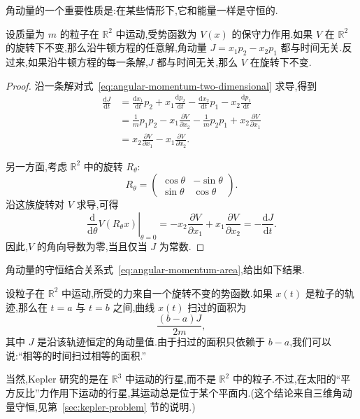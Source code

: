 角动量的一个重要性质是:在某些情形下,它和能量一样是守恒的.

\begin{proposition}[旋转不变性与角动量]\label{pro:angular-momentum-conservation}
设质量为 $m$ 的粒子在 $\mathbb{R}^{2}$ 中运动,受势函数为 $V(x)$ 的保守力作用.如果 $V$ 在 $\mathbb{R}^{2}$ 的旋转下不变,那么沿牛顿方程的任意解,角动量 $J=x_{1}p_{2}-x_{2}p_{1}$ 都与时间无关.反过来,如果沿牛顿方程的每一条解,$J$ 都与时间无关,那么 $V$ 在旋转下不变.
\end{proposition}

\begin{proof}
沿一条解对式~\eqref{eq:angular-momentum-two-dimensional} 求导,得到
\begin{align*}
\frac{\mathrm{d}J}{\mathrm{d}t}
 &=\frac{\mathrm{d}x_{1}}{\mathrm{d}t}p_{2}+x_{1}\frac{\mathrm{d}p_{2}}{\mathrm{d}t}
  -\frac{\mathrm{d}x_{2}}{\mathrm{d}t}p_{1}-x_{2}\frac{\mathrm{d}p_{1}}{\mathrm{d}t}\\
 &=\frac1m p_{1}p_{2}-x_{1}\frac{\partial V}{\partial x_{2}}
  -\frac1m p_{2}p_{1}+x_{2}\frac{\partial V}{\partial x_{1}}\\
 &=x_{2}\frac{\partial V}{\partial x_{1}}-x_{1}\frac{\partial V}{\partial x_{2}}.
\end{align*}

另一方面,考虑 $\mathbb{R}^{2}$ 中的旋转 $R_{\theta}$:
\[
  R_{\theta}=\begin{pmatrix}
    \cos\theta&-\sin\theta\\
    \sin\theta&\cos\theta
  \end{pmatrix}.
\]
沿这族旋转对 $V$ 求导,可得
\[
\left.\frac{\mathrm{d}}{\mathrm{d}\theta}V(R_{\theta}x)\right|_{\theta=0}
=-x_{2}\frac{\partial V}{\partial x_{1}}+x_{1}\frac{\partial V}{\partial x_{2}}
=-\frac{\mathrm{d}J}{\mathrm{d}t}.
\]
因此,$V$ 的角向导数为零,当且仅当 $J$ 为常数.
\end{proof}

角动量的守恒结合关系式~\eqref{eq:angular-momentum-area},给出如下结果.

\begin{corollary}\label{cor:kepler-second-law}
设粒子在 $\mathbb{R}^{2}$ 中运动,所受的力来自一个旋转不变的势函数.如果 $x(t)$ 是粒子的轨迹,那么在 $t=a$ 与 $t=b$ 之间,曲线 $x(t)$ 扫过的面积为
\[
  \frac{(b-a)J}{2m},
\]
其中 $J$ 是沿该轨迹恒定的角动量值.由于扫过的面积只依赖于 $b-a$,我们可以说:“相等的时间扫过相等的面积.”
\end{corollary}

当然,Kepler 研究的是在 $\mathbb{R}^{3}$ 中运动的行星,而不是 $\mathbb{R}^{2}$ 中的粒子.不过,在太阳的“平方反比”力作用下运动的行星,其运动总是位于某个平面内.(这个结论来自三维角动量守恒,见第~\ref{sec:kepler-problem} 节的说明.)

